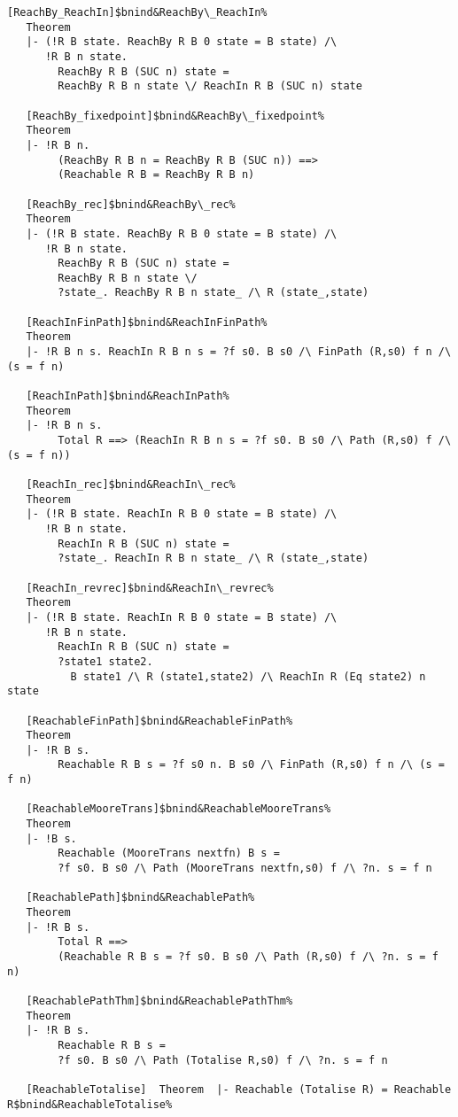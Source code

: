 \documentclass[12pt]{article}
\begin{document}
\begin{footnotesize}
\begin{Verbatim}[commandchars=\$\&\%]
   [ReachBy_ReachIn]$bnind&ReachBy\_ReachIn%
   Theorem
   |- (!R B state. ReachBy R B 0 state = B state) /\
      !R B n state.
        ReachBy R B (SUC n) state =
        ReachBy R B n state \/ ReachIn R B (SUC n) state
   
   [ReachBy_fixedpoint]$bnind&ReachBy\_fixedpoint%
   Theorem
   |- !R B n.
        (ReachBy R B n = ReachBy R B (SUC n)) ==>
        (Reachable R B = ReachBy R B n)
   
   [ReachBy_rec]$bnind&ReachBy\_rec%
   Theorem
   |- (!R B state. ReachBy R B 0 state = B state) /\
      !R B n state.
        ReachBy R B (SUC n) state =
        ReachBy R B n state \/
        ?state_. ReachBy R B n state_ /\ R (state_,state)
   
   [ReachInFinPath]$bnind&ReachInFinPath%
   Theorem
   |- !R B n s. ReachIn R B n s = ?f s0. B s0 /\ FinPath (R,s0) f n /\ (s = f n)
   
   [ReachInPath]$bnind&ReachInPath%
   Theorem
   |- !R B n s.
        Total R ==> (ReachIn R B n s = ?f s0. B s0 /\ Path (R,s0) f /\ (s = f n))
   
   [ReachIn_rec]$bnind&ReachIn\_rec%
   Theorem
   |- (!R B state. ReachIn R B 0 state = B state) /\
      !R B n state.
        ReachIn R B (SUC n) state =
        ?state_. ReachIn R B n state_ /\ R (state_,state)
   
   [ReachIn_revrec]$bnind&ReachIn\_revrec%
   Theorem
   |- (!R B state. ReachIn R B 0 state = B state) /\
      !R B n state.
        ReachIn R B (SUC n) state =
        ?state1 state2.
          B state1 /\ R (state1,state2) /\ ReachIn R (Eq state2) n state
   
   [ReachableFinPath]$bnind&ReachableFinPath%
   Theorem
   |- !R B s.
        Reachable R B s = ?f s0 n. B s0 /\ FinPath (R,s0) f n /\ (s = f n)
   
   [ReachableMooreTrans]$bnind&ReachableMooreTrans%
   Theorem
   |- !B s.
        Reachable (MooreTrans nextfn) B s =
        ?f s0. B s0 /\ Path (MooreTrans nextfn,s0) f /\ ?n. s = f n
   
   [ReachablePath]$bnind&ReachablePath%
   Theorem
   |- !R B s.
        Total R ==>
        (Reachable R B s = ?f s0. B s0 /\ Path (R,s0) f /\ ?n. s = f n)
   
   [ReachablePathThm]$bnind&ReachablePathThm%
   Theorem
   |- !R B s.
        Reachable R B s =
        ?f s0. B s0 /\ Path (Totalise R,s0) f /\ ?n. s = f n
   
   [ReachableTotalise]  Theorem  |- Reachable (Totalise R) = Reachable R$bnind&ReachableTotalise%
   

\end{Verbatim}
\end{footnotesize}
\end{document}
